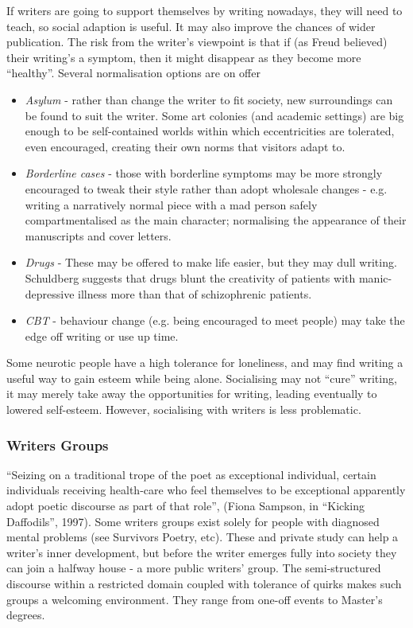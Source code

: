 \documentclass[11pt]{article}
\begin{document}
If writers are going to support themselves by writing nowadays, they will need to teach, so social adaption is useful. It may also improve the chances of wider publication. The risk from the writer's viewpoint is that if (as Freud believed) their writing's a symptom, then it might disappear as they become more ``healthy''. Several normalisation options are on offer
\begin{itemize}
         \item  \textit{Asylum} - rather than change the writer to fit society, new surroundings can be found to suit the writer. Some art colonies (and academic settings) are big enough to be self-contained worlds within which eccentricities are tolerated, even encouraged, creating their own norms that visitors adapt to.
         \item  \textit{ Borderline cases} - those with borderline symptoms may be more strongly encouraged to tweak their style rather than adopt wholesale changes - e.g. writing a narratively normal piece with a mad person safely compartmentalised as the main character; normalising the appearance of their manuscripts and cover letters.
         \item   \textit{Drugs} - These may be offered to make life easier, but they may dull writing. Schuldberg suggests that drugs blunt the creativity of patients with manic-depressive illness more than that of schizophrenic patients.
         \item   \textit{CBT} - behaviour change (e.g. being encouraged to meet people) may take the edge off writing or use up time.
\end{itemize}

Some neurotic people have a high tolerance for loneliness, and may find  writing a useful way to gain esteem while being alone. Socialising may not  ``cure'' writing, it may merely take away the opportunities for writing, leading  eventually to lowered self-esteem. However, socialising with writers 
is less problematic.

\subsubsection*{Writers Groups}

 ``Seizing on a traditional trope of the poet as exceptional individual, certain individuals receiving health-care who feel themselves to be exceptional apparently adopt poetic discourse as part of that role'', (Fiona Sampson, in ``Kicking Daffodils'', 1997). Some writers groups exist solely for people with diagnosed mental problems (see Survivors Poetry, etc). These and private study can help a writer's inner development, but before the writer emerges fully into society they can join a halfway house - a more public writers' group. The semi-structured discourse within a restricted domain coupled with tolerance of quirks makes such groups a welcoming environment. They range from one-off events to Master's degrees.
\end{document}
